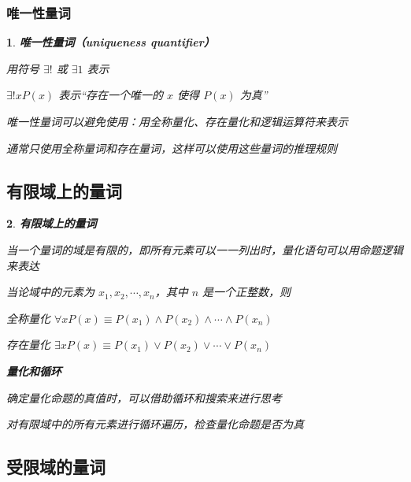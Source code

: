 \documentclass[UTF8]{report}
\theoremstyle{MyLineTheoremStyle} %
\theoremstyle{MyBlockTheoremStyle} %
\theoremstyle{MySubsubsectionStyle} %
\newtheorem{definition}{}
\begin{document}
\subsubsection{唯一性量词}

\begin{definition}
    \textbf{唯一性量词（uniqueness quantifier）}\par
    用符号 $\exists !$ 或 $\exists 1$ 表示\par
    $\exists ! x P(x)$ 表示“存在一个唯一的 $x$ 使得 $P(x)$ 为真”\par
    唯一性量词可以避免使用：用全称量化、存在量化和逻辑运算符来表示\par
    通常只使用全称量词和存在量词，这样可以使用这些量词的推理规则\par
\end{definition}

\subsection{有限域上的量词}

\begin{definition}
    \textbf{有限域上的量词}\par
    当一个量词的域是有限的，即所有元素可以一一列出时，量化语句可以用命题逻辑来表达\par
    当论域中的元素为 $x_1, x_2, \cdots , x_n$，其中 $n$ 是一个正整数，则\par
    全称量化 $\forall x P(x) \equiv P(x_1) \land P(x_2) \land \cdots \land P(x_n)$\par
    存在量化 $\exists x P(x) \equiv P(x_1) \lor P(x_2) \lor \cdots \lor P(x_n)$\par

    \textbf{量化和循环}\par
    确定量化命题的真值时，可以借助循环和搜索来进行思考\par
    对有限域中的所有元素进行循环遍历，检查量化命题是否为真\par
\end{definition}

\subsection{受限域的量词}
\end{document}
